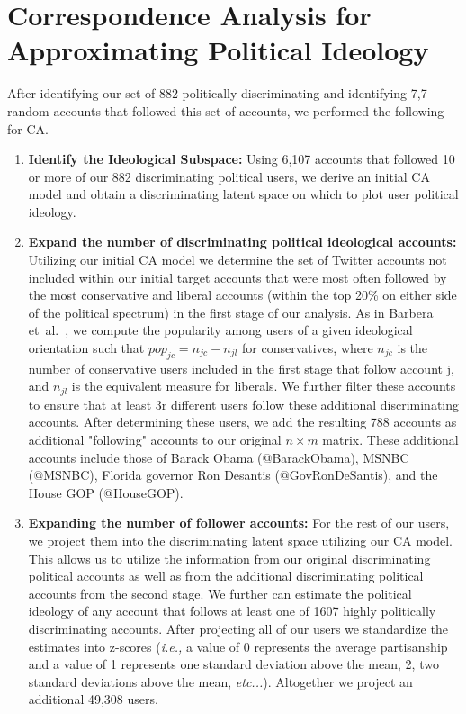 \section{Correspondence Analysis for Approximating Political Ideology\label{sec:appendix-ca}}
After identifying our set of 882 politically discriminating and identifying 7,7 random accounts that followed this set of accounts, we performed the following for CA. 

\begin{enumerate}
\item{\textbf{Identify the Ideological Subspace:}} Using 6,107 accounts that followed 10 or more of our 882 discriminating political users, we derive an initial CA model and obtain a discriminating latent space on which to plot user political ideology. 

\item{\textbf{Expand the number of discriminating political ideological accounts:}} Utilizing our initial CA model we determine the set of Twitter accounts not included within our initial target accounts that were most often followed by the most conservative and liberal accounts (within the top 20\% on either side of the political spectrum) in the first stage of our analysis. As in Barbera et~al.~\cite{barbera2015tweeting}, we compute the popularity among users of a given ideological orientation such that $pop_{jc} = n_{jc} -  n_{jl}$  for conservatives, where $n_{jc}$ is the number of conservative users included in the first stage
that follow account j, and $n_{jl}$ is the equivalent measure for liberals. We further filter these accounts to ensure that at least 3r different users follow these additional discriminating accounts. After determining these users, we add the resulting 788 accounts as additional "following" accounts to our original $n \times m$ matrix. These additional accounts include those of Barack Obama (@BarackObama), MSNBC (@MSNBC), Florida governor Ron Desantis (@GovRonDeSantis), and the House GOP (@HouseGOP).

\item{\textbf{Expanding the number of follower accounts:}} For the rest of our users, we project them into the discriminating latent space utilizing our CA model. This allows us to utilize the information from our original discriminating political accounts as well as from the additional discriminating political accounts from the second stage. We further can estimate the political ideology of any account that follows at least one of 1607 highly politically discriminating accounts. After projecting all of our users we standardize the estimates into z-scores  (\textit{i.e.,} a value of 0 represents the average partisanship and a value of 1 represents one standard deviation above the mean, 2, two standard deviations above the mean, \textit{etc...}). Altogether we project an additional 49,308 users. 


\end{enumerate}

